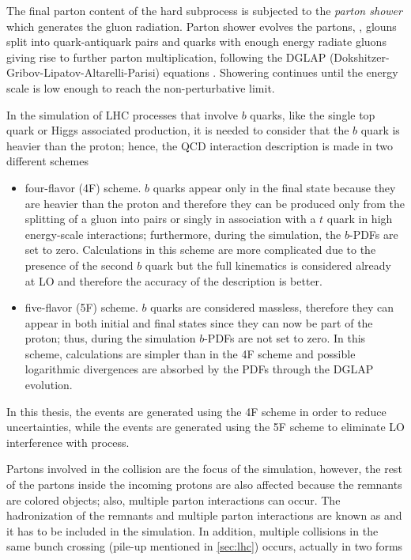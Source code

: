 The final parton content of the hard subprocess is subjected to the \textit{parton shower} which generates the gluon radiation. Parton shower evolves the partons, \ie, glouns split into quark-antiquark pairs and quarks with enough energy radiate gluons giving rise to further parton multiplication, following the DGLAP (Dokshitzer-Gribov-Lipatov-Altarelli-Parisi) equations \cite{dglap1,dglap2,dglap3}. Showering continues until the energy scale is low enough to reach the non-perturbative limit.   

In the simulation of LHC processes that involve $b$ quarks, like the single top quark or Higgs associated production, it is needed to consider that the $b$ quark is heavier than the proton; hence, the QCD interaction description is made in two different schemes \cite{schemes}

\begin{itemize}

\item four-flavor (4F) scheme. $b$ quarks appear only in the final state because they are heavier than the proton and therefore they can be produced only from the splitting of a gluon into pairs or singly in association with a $t$ quark in high energy-scale interactions; furthermore, during the simulation, the $b$-PDFs are set to zero. Calculations in this scheme are more complicated due to the presence of the second $b$ quark but the full kinematics is considered already at LO and therefore the accuracy of the description is better.   

\item five-flavor (5F) scheme. $b$ quarks are considered massless, therefore they can appear in both initial and final states since they can now be part of the proton; thus, during the simulation $b$-PDFs are not set to zero. In this scheme, calculations are simpler than in the 4F scheme and possible logarithmic divergences are absorbed by the PDFs through the DGLAP evolution.   
\end{itemize}

In this thesis, the \tHq events are generated using the 4F scheme in order to reduce uncertainties, while the \tHW events are generated using the 5F scheme to eliminate LO interference with \ttH process\cite{demartin}.    

Partons involved in the \pp collision are the focus of the simulation, however, the rest of the partons inside the incoming protons are also affected because the remnants are colored objects; also, multiple parton interactions can occur. The hadronization of the remnants and multiple parton interactions are known as  and it has to be included in the simulation. In addition, multiple \pp collisions in the same bunch crossing (pile-up mentioned in \ref{sec:lhc}) occurs, actually in two forms

